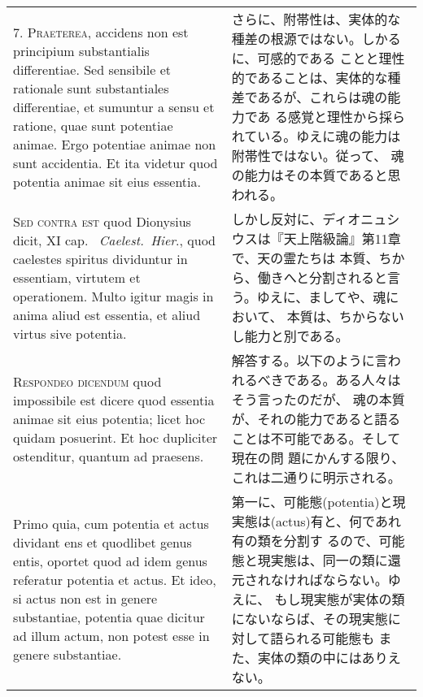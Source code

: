 \documentclass[paper=a4paper,fontsize=10pt,jafontsize=9pt,titlepage]{jlreq}
\begin{document}
\begin{longtable}{p{21em}p{21em}}
7. {\scshape Praeterea}, accidens non est principium substantialis
differentiae. Sed sensibile et rationale sunt substantiales
differentiae, et sumuntur a sensu et ratione, quae sunt potentiae
animae. Ergo potentiae animae non sunt accidentia. Et ita videtur quod
potentia animae sit eius essentia.

&

 さらに、附帯性は、実体的な種差の根源ではない。しかるに、可感的である
 ことと理性的であることは、実体的な種差であるが、これらは魂の能力であ
 る感覚と理性から採られている。ゆえに魂の能力は附帯性ではない。従って、
 魂の能力はその本質であると思われる。


\\



{\scshape Sed contra est} quod Dionysius dicit, XI cap.~{\itshape
Caelest.~Hier}., quod caelestes spiritus dividuntur in essentiam,
virtutem et operationem. Multo igitur magis in anima aliud est
essentia, et aliud virtus sive potentia.

&

 しかし反対に、ディオニュシウスは『天上階級論』第11章で、天の霊たちは
 本質、ちから、働きへと分割されると言う。ゆえに、ましてや、魂において、
 本質は、ちからないし能力と別である。


\\



{\scshape Respondeo dicendum} quod impossibile est dicere quod
essentia animae sit eius potentia; licet hoc quidam posuerint. Et hoc
 dupliciter ostenditur, quantum ad praesens.


&

 解答する。以下のように言われるべきである。ある人々はそう言ったのだが、
 魂の本質が、それの能力であると語ることは不可能である。そして現在の問
 題にかんする限り、これは二通りに明示される。

\\


 Primo quia, cum potentia et actus dividant ens et quodlibet genus
entis, oportet quod ad idem genus referatur potentia et actus. Et
ideo, si actus non est in genere substantiae, potentia quae dicitur ad
illum actum, non potest esse in genere substantiae.

&

 第一に、可能態(potentia)と現実態は(actus)有と、何であれ有の類を分割す
 るので、可能態と現実態は、同一の類に還元されなければならない。ゆえに、
 もし現実態が実体の類にないならば、その現実態に対して語られる可能態も
 また、実体の類の中にはありえない。



\end{longtable}
\end{document}
